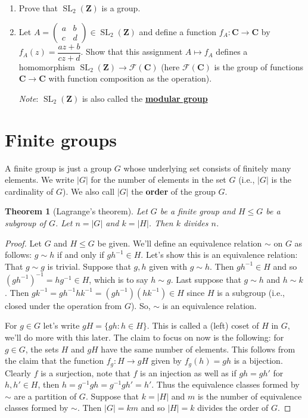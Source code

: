 \documentclass[12pt]{article}
\numberwithin{equation}{subsection}
\newtheorem{thm}[subsection]{Theorem}
\theoremstyle{note}
\newcommand{\SL}{\operatorname{SL}}
\begin{document}
\begin{enumerate}[label=\arabic*.]
	\begin{enumerate}
		\item Prove that $\SL_2(\mathbf{Z})$ is a group.
		\item Let $A=\begin{pmatrix} a & b \\ c & d \end{pmatrix} \in \SL_2(\mathbf{Z})$ and define a function $f_A\colon\mathbf{C}\to\mathbf{C}$ by $f_A(z)=\dfrac{az+b}{cz+d}$. Show that this assignment $A\mapsto f_A$ defines a homomorphism $\SL_2(\mathbf{Z})\to\mathcal{F}(\mathbf{C})$ (here $\mathcal{F}(\mathbf{C})$ is the group of functions $\mathbf{C}\to\mathbf{C}$ with function composition as the operation). 
		
		\textit{Note}: $\SL_2(\mathbf{Z})$ is also called the \href{https://en.wikipedia.org/wiki/Modular_group}{\textbf{modular group}}
	\end{enumerate}
\end{enumerate}


\section{Finite groups}
A finite group is just a group $G$ whose underlying set consists of finitely many elements. We write $|G|$ for the number of elements in the set $G$ (i.e., $|G|$ is the cardinality of $G$). We also call $|G|$ the \textbf{order} of the group $G$. 


\begin{thm}[Lagrange's theorem]\label{Lag-thm}
	Let $G$ be a finite group and $H\leq G$ be a subgroup of $G$. Let $n=|G|$ and $k=|H|$. Then $k$ divides $n$. 
\end{thm}

\begin{proof}
	Let $G$ and $H\leq G$ be given. We'll define an equivalence relation $\sim$ on $G$ as follows: $g\sim h$ if and only if $gh^{-1}\in H$. Let's show this is an equivalence relation: That $g\sim g$ is trivial. Suppose that $g,h$ given with $g\sim h$. Then $gh^{-1}\in H$ and so $(gh^{-1})^{-1}=hg^{-1}\in H$, which is to say $h\sim g$. Last suppose that $g\sim h$ and $h\sim k$. Then $gk^{-1}=gh^{-1}hk^{-1}=(gh^{-1})(hk^{-1})\in H$ since $H$ is a subgroup (i.e., closed under the operation from $G$). So, $\sim$ is an equivalence relation. 
	
	For $g\in G$ let's write $gH=\{gh : h\in H\}$. This is called a (left) coset of $H$ in $G$, we'll do more with this later. The claim to focus on now is the following: for $g\in G$, the sets $H$ and $gH$ have the same number of elements. This follows from the claim that the function $f_g\colon H \to gH$ given by $f_g(h)=gh$ is a bijection. Clearly $f$ is a surjection, note that $f$ is an injection as well as if $gh=gh'$ for $h,h'\in H$, then $h=g^{-1}gh=g^{-1}gh'=h'$. Thus the equivalence classes formed by $\sim$ are a partition of $G$. Suppose that $k=|H|$ and $m$ is the number of equivalence classes formed by $\sim$. Then $|G|=km$ and so $|H|=k$ divides the order of $G$. \end{proof}
\end{document}
